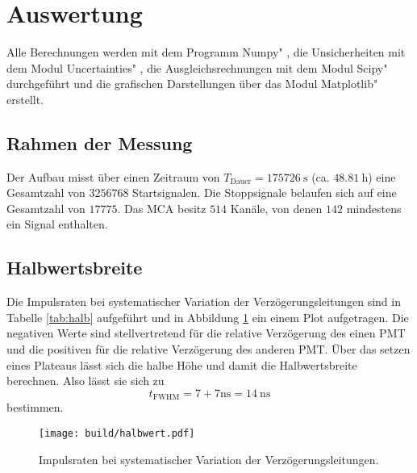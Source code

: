 \section{Auswertung}
\label{sec:Auswertung}
Alle Berechnungen werden mit dem Programm \glqq Numpy" \cite{numpy}, die Unsicherheiten mit dem Modul \glqq Uncertainties" \cite{uncertainties}, die Ausgleichsrechnungen mit dem Modul \glqq Scipy" \cite{scipy} durchgeführt und die grafischen Darstellungen über das Modul \glqq Matplotlib" \cite{matplotlib} erstellt.


\subsection{Rahmen der Messung}
Der Aufbau misst über einen Zeitraum von $T_\text{Dauer} = \SI{175726}{\s}$ (ca. $\SI{48.81}{\hour}$) eine Gesamtzahl von $\num{3256768}$ Startsignalen. Die Stoppsignale belaufen sich auf eine Gesamtzahl von $\num{17775}$. Das MCA besitz $\num{514}$ Kanäle, von denen $\num{142}$ mindestens ein Signal enthalten.  


\subsection{Halbwertsbreite}

Die Impulsraten bei systematischer Variation der Verzögerungsleitungen sind in Tabelle \ref{tab:halb} aufgeführt und in Abbildung \ref{fig:halb} ein einem Plot aufgetragen. Die negativen Werte sind stellvertretend für die relative Verzögerung des einen PMT und die positiven für die relative Verzögerung des anderen PMT. Über das setzen eines Plateaus lässt sich die halbe Höhe und damit die Halbwertsbreite berechnen.
Also lässt sie sich zu
\begin{equation}
    t_\text{FWHM} = 7+7 \si{\nano\s} = \SI{14}{\nano\s}
\end{equation}
bestimmen.


\begin{figure}
    \centering
    \texttt{[image: build/halbwert.pdf]}
    \caption{Impulsraten bei systematischer Variation der Verzögerungsleitungen.}
    \label{fig:halb}
\end{figure}

